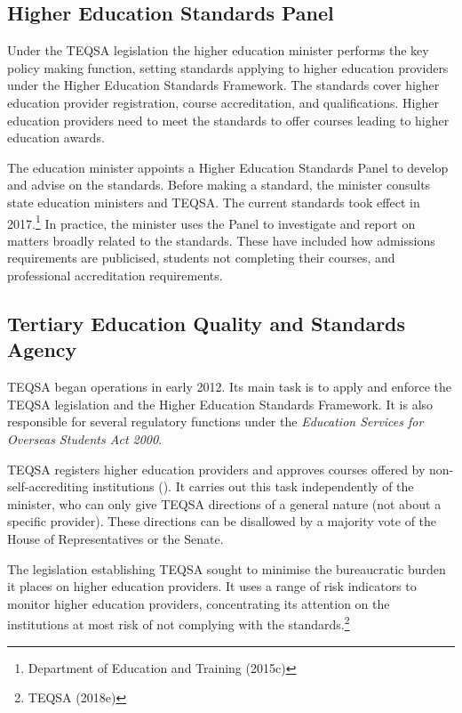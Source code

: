 \documentclass{grattan}
\begin{document}
%
\subsection{Higher Education Standards Panel}\label{subsec:higher-education-standards-panel}

Under the TEQSA legislation the higher education minister performs the key policy making function, setting standards applying to higher education providers under the Higher Education Standards Framework. The standards cover higher education provider registration, course accreditation, and qualifications. Higher education providers need to meet the standards to offer courses leading to higher education awards.

The education minister appoints a Higher Education Standards Panel to develop and advise on the standards. Before making a standard, the minister consults state education ministers and TEQSA. The current standards took effect in 2017.\footnote{Department of Education and Training (2015c)} In practice, the minister uses the Panel to investigate and report on matters broadly related to the standards. These have included how admissions requirements are publicised, students not completing their courses, and professional accreditation requirements.

%
\subsection{Tertiary Education Quality and Standards Agency}\label{subsec:tertiary-education-quality-and-standards-agency}

TEQSA began operations in early 2012. Its main task is to apply and enforce the TEQSA legislation and the Higher Education Standards Framework. It is also responsible for several regulatory functions under the \emph{Education Services for Overseas Students Act 2000}.

TEQSA registers higher education providers and approves courses offered by non-self-accrediting institutions (). It carries out this task independently of the minister, who can only give TEQSA directions of a general nature (not about a specific provider). These directions can be disallowed by a majority vote of the House of Representatives or the Senate.

The legislation establishing TEQSA sought to minimise the bureaucratic burden it places on higher education providers. It uses a range of risk indicators to monitor higher education providers, concentrating its attention on the institutions at most risk of not complying with the standards.\footnote{TEQSA (2018e)}
\end{document}
